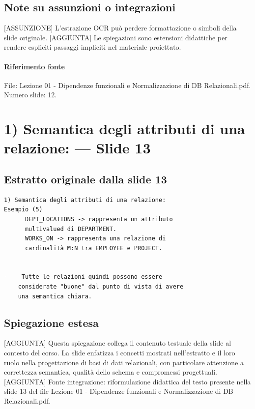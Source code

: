 \documentclass[11pt]{article}
\begin{document}
\subsection*{Note su assunzioni o integrazioni}
[ASSUNZIONE] L'estrazione OCR può perdere formattazione o simboli della slide originale.
[AGGIUNTA] Le spiegazioni sono estensioni didattiche per rendere espliciti passaggi impliciti nel materiale proiettato.
\paragraph{Riferimento fonte} File: Lezione 01 - Dipendenze funzionali e Normalizzazione di DB Relazionali.pdf. Numero slide: 12.
\section{1) Semantica degli attributi di una relazione: --- Slide 13}
\subsection*{Estratto originale dalla slide 13}
\begin{lstlisting}
1) Semantica degli attributi di una relazione:
Esempio (5)
      DEPT_LOCATIONS -> rappresenta un attributo
      multivalued di DEPARTMENT.
      WORKS_ON -> rappresenta una relazione di
      cardinalità M:N tra EMPLOYEE e PROJECT.


-    Tutte le relazioni quindi possono essere
    considerate "buone" dal punto di vista di avere
    una semantica chiara.
\end{lstlisting}
\subsection*{Spiegazione estesa}
[AGGIUNTA] Questa spiegazione collega il contenuto testuale della slide al contesto del corso. La slide enfatizza i concetti mostrati nell'estratto e il loro ruolo nella progettazione di basi di dati relazionali, con particolare attenzione a correttezza semantica, qualità dello schema e compromessi progettuali.
[AGGIUNTA] Fonte integrazione: riformulazione didattica del testo presente nella slide 13 del file Lezione 01 - Dipendenze funzionali e Normalizzazione di DB Relazionali.pdf.
\end{document}

